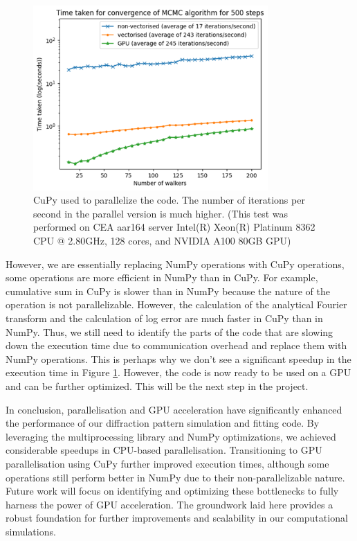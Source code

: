 \begin{figure}[h]
    \centering
    \includegraphics[width=0.8\textwidth]{images/gpu.png}
    \caption{CuPy used to parallelize the code. The number of iterations per second in the parallel version is much higher. (This test was performed 
    on CEA aar164 server Intel(R) Xeon(R) Platinum 8362 CPU @ 2.80GHz, 128 cores, and NVIDIA A100 80GB GPU)}
    \label{fig:cupy}
\end{figure}

\FloatBarrier

However, we are essentially replacing NumPy operations with CuPy operations, some operations 
are more efficient in NumPy than in CuPy. For example, cumulative sum in CuPy is slower than in 
NumPy because the nature of the operation is not parallelizable. However, the calculation of the 
analytical Fourier transform and the calculation of log error are much faster in CuPy than in 
NumPy. Thus, we still need to identify the parts of the code that are slowing down the execution 
time due to communication overhead and replace them with NumPy operations. This is perhaps why 
we don't see a significant speedup in the execution time in Figure \ref{fig:cupy}. However, the 
code is now ready to be used on a GPU and can be further optimized. This will be the next step 
in the project.

\medskip

In conclusion, parallelisation and GPU acceleration have significantly enhanced the performance
of our diffraction pattern simulation and fitting code. By leveraging the multiprocessing 
library and NumPy optimizations, we achieved considerable speedups in CPU-based parallelisation. 
Transitioning to GPU parallelisation using CuPy further improved execution times, although some
operations still perform better in NumPy due to their non-parallelizable nature. Future work 
will focus on identifying and optimizing these bottlenecks to fully harness the power of GPU 
acceleration. The groundwork laid here provides a robust foundation for further improvements 
and scalability in our computational simulations.


